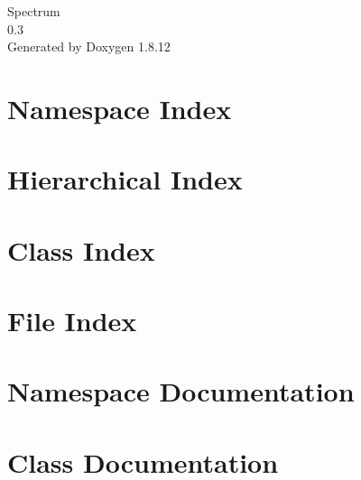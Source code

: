 \documentclass[twoside]{book}
\newcommand{\+}{\discretionary{\mbox{\scriptsize$\hookleftarrow$}}{}{}}
\newcommand{\clearemptydoublepage}{%
  \newpage{\pagestyle{empty}\cleardoublepage}%
}
\begin{document}
\hypersetup{pageanchor=false,
             bookmarksnumbered=true,
             pdfencoding=unicode
            }
\begin{titlepage}
\vspace*{7cm}
\begin{center}%
{\Large Spectrum \\[1ex]\large 0.\+3 }\\
\vspace*{1cm}
{\large Generated by Doxygen 1.8.12}\\
\end{center}
\end{titlepage}
\clearemptydoublepage
{}
\tableofcontents
\clearemptydoublepage
{}
\hypersetup{pageanchor=true}

\chapter{Namespace Index}

\chapter{Hierarchical Index}

\chapter{Class Index}

\chapter{File Index}

\chapter{Namespace Documentation}

\chapter{Class Documentation}





























\end{document}
